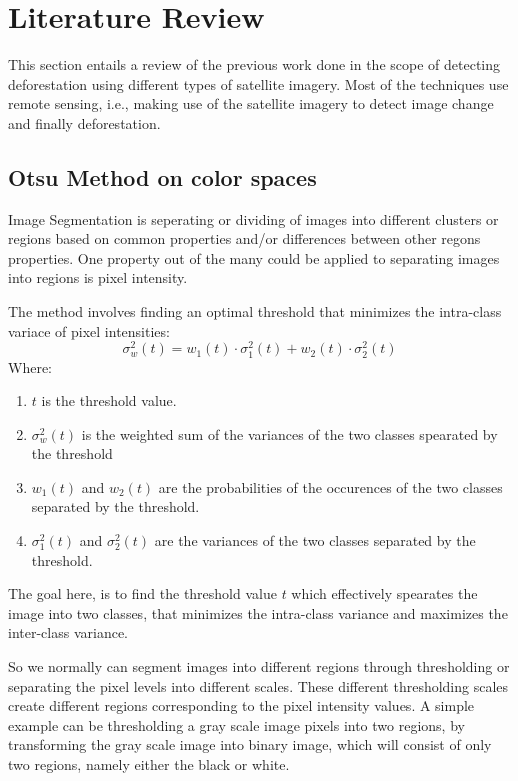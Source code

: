 \documentclass[12pt,a4paper,IEEEtran]{article}
\begin{document}
\section{Literature Review}
This section entails a review of the previous work done in the scope of detecting deforestation using different types of satellite imagery. Most of the techniques use remote sensing, i.e., making use of the satellite imagery to detect image change and finally deforestation.


\subsection[3.1]{Otsu Method on color spaces}
Image Segmentation is seperating or dividing of images into different clusters or regions based on common properties and/or differences between other regons properties. One property out of the many could be applied to separating images into regions is pixel intensity. 

The method involves finding an optimal threshold that minimizes the intra-class variace of pixel intensities:
\begin{equation}
	\sigma^2_w(t) = w_1(t) \cdot \sigma_1^2(t) + w_2(t) \cdot \sigma_2^2(t)
\end{equation}
Where: 
\begin{enumerate}
	\item $t$ is the threshold value.
	\item $\sigma^2_w(t)$ is the weighted sum of the variances of the two classes spearated by the threshold
	\item $w_1(t)$ and $w_2(t)$ are the probabilities of the occurences of the two classes separated by the threshold.
	\item $\sigma_1^2(t)$ and $\sigma_2^2(t)$ are the variances of the two classes separated by the threshold.
\end{enumerate}
The goal here, is to find the threshold value $t$ which effectively spearates the image into two classes, that minimizes the intra-class variance and maximizes the inter-class variance. \cite{5254345}

So we normally can segment images into different regions through thresholding or separating the pixel levels into different scales. These different thresholding scales create different regions corresponding to the pixel intensity values. 
\newline A simple example can be thresholding a gray scale image pixels into two regions, by transforming the gray scale image into binary image, which will consist of only two regions, namely either the black or white.
\end{document}
